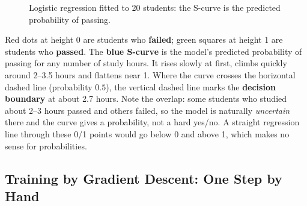 \begin{figure}[!htbp]
\centering
{}
\caption{Logistic regression fitted to 20 students: the S-curve is the predicted probability of passing.}\label{fig:logfit}
\end{figure}

\begin{explain}
Red dots at height 0 are students who \textbf{failed}; green squares at height 1 are students who \textbf{passed}. The \textbf{blue S-curve} is the model's predicted probability of passing for any number of study hours. It rises slowly at first, climbs quickly around 2--3.5 hours and flattens near 1. Where the curve crosses the horizontal dashed line (probability $0.5$), the vertical dashed line marks the \textbf{decision boundary} at about 2.7 hours. Note the overlap: some students who studied about 2--3 hours passed and others failed, so the model is naturally \emph{uncertain} there and the curve gives a probability, not a hard yes/no. A straight regression line through these 0/1 points would go below 0 and above 1, which makes no sense for probabilities.
\end{explain}

\subsection{Training by Gradient Descent: One Step by Hand}

